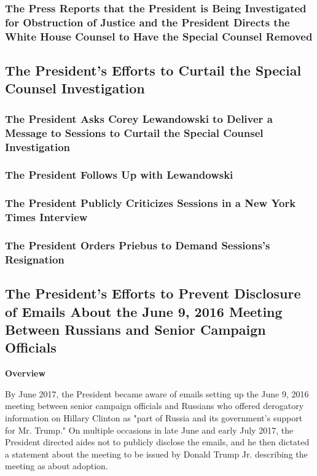 \subsubsection{The Press Reports that the President is Being Investigated for Obstruction of Justice and the President Directs the White House Counsel to Have the Special Counsel Removed}

\subsection{The President's Efforts to Curtail the Special Counsel Investigation}

\subsubsection{The President Asks Corey Lewandowski to Deliver a Message to Sessions to Curtail the Special Counsel Investigation}

\subsubsection{The President Follows Up with Lewandowski}

\subsubsection{The President Publicly Criticizes Sessions in a New York Times Interview}

\subsubsection{The President Orders Priebus to Demand Sessions's Resignation}

\subsection{The President's Efforts to Prevent Disclosure of Emails About the June 9, 2016 Meeting Between Russians and Senior Campaign Officials}

\begin{center}
\textbf{Overview}
\end{center}

By June 2017, the President became aware of emails setting up the June 9, 2016 meeting between senior campaign officials and Russians who offered derogatory information on Hillary Clinton as "part of Russia and its government's support for Mr. Trump."
On multiple occasions in late June and early July 2017, the President directed aides not to publicly disclose the emails, and he then dictated a statement about the meeting to be issued by Donald Trump Jr. describing the meeting as about adoption.


